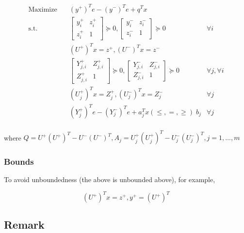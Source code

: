 \documentclass[../main]{subfiles}
\begin{document}
\begin{equation}
  \begin{aligned}
    \mathrm{Maximize}\quad               & (y^+)^Te - (y^-)^Te + q^Tx                                        \\
    \mathrm{s.t.} \quad                  & \begin{bmatrix}y^+_i & z^+_i \\ z^+_i & 1 \end{bmatrix} \succeq 0,
    \begin{bmatrix}y^-_i & z^-_i \\ z^-_i & 1 \end{bmatrix} \succeq 0 & \forall i                                                         \\
                                         & (U^+)^Tx = z^+, (U^-)^Tx = z^-                                    \\
                                         & \begin{bmatrix}Y^+_{j, i} & Z^+_{j, i}\\ Z^+_{j, i} & 1 \end{bmatrix} \succeq 0,
    \begin{bmatrix} Y^-_{j, i} & Z^-_{j, i} \\ Z^-_{j, i} & 1 \end{bmatrix} \succeq 0 & \forall j, \forall i                                              \\
                                         & (U^+_j)^Tx = Z^+_j, (U^-_j)^Tx = Z^-_j                & \forall j \\
                                         & (Y^+_j)^Te - (Y^-_j)^Te + a_j^Tx (\le, =, \ge) \; b_j & \forall j \\
  \end{aligned}
\end{equation}

where \(Q =  U^+ (U^+)^T - U^- (U^-)^T, A_j = U^+_j (U^+_j)^T - U^-_j (U^-_j)^T, j = 1,...,m\)


\subsubsection{Bounds}
To avoid unboundedness (the above is unbounded above), for example,

\[(U^+)^Tx = z^+, y^+ = (U^+)^T\]


\subsection{Remark}
\end{document}
